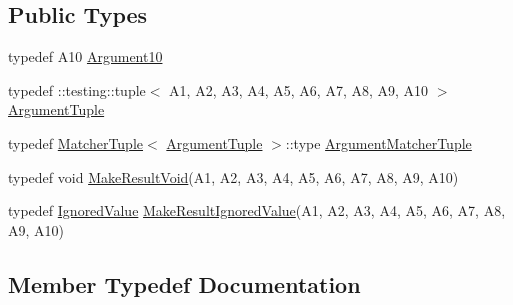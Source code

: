 \subsection*{Public Types}
\begin{DoxyCompactItemize}
\item 
typedef A10 \mbox{\hyperlink{structtesting_1_1internal_1_1_function_3_01_r_07_a1_00_01_a2_00_01_a3_00_01_a4_00_01_a5_00_01_a6f6ff91550f0557b7708e490e5002cd35_a74022db8f1642276a1a9033da16cc2f5}{Argument10}}
\item 
typedef \+::testing\+::tuple$<$ A1, A2, A3, A4, A5, A6, A7, A8, A9, A10 $>$ \mbox{\hyperlink{structtesting_1_1internal_1_1_function_3_01_r_07_a1_00_01_a2_00_01_a3_00_01_a4_00_01_a5_00_01_a6f6ff91550f0557b7708e490e5002cd35_a38b8a4911806458eacc69740d4638d87}{Argument\+Tuple}}
\item 
typedef \mbox{\hyperlink{structtesting_1_1internal_1_1_matcher_tuple}{Matcher\+Tuple}}$<$ \mbox{\hyperlink{structtesting_1_1internal_1_1_function_3_01_r_07_08_4_ad483c3128c470d8cdb55c3ac1c575c11}{Argument\+Tuple}} $>$\+::type \mbox{\hyperlink{structtesting_1_1internal_1_1_function_3_01_r_07_a1_00_01_a2_00_01_a3_00_01_a4_00_01_a5_00_01_a6f6ff91550f0557b7708e490e5002cd35_ad2418eacffea2e3cc5466c93b1fd7002}{Argument\+Matcher\+Tuple}}
\item 
typedef void \mbox{\hyperlink{structtesting_1_1internal_1_1_function_3_01_r_07_a1_00_01_a2_00_01_a3_00_01_a4_00_01_a5_00_01_a6f6ff91550f0557b7708e490e5002cd35_aa0f1fef89e59875917d08ba584b05186}{Make\+Result\+Void}}(A1, A2, A3, A4, A5, A6, A7, A8, A9, A10)
\item 
typedef \mbox{\hyperlink{classtesting_1_1internal_1_1_ignored_value}{Ignored\+Value}} \mbox{\hyperlink{structtesting_1_1internal_1_1_function_3_01_r_07_a1_00_01_a2_00_01_a3_00_01_a4_00_01_a5_00_01_a6f6ff91550f0557b7708e490e5002cd35_a4e905802374219aa3e556ccc65191098}{Make\+Result\+Ignored\+Value}}(A1, A2, A3, A4, A5, A6, A7, A8, A9, A10)
\end{DoxyCompactItemize}


\subsection{Member Typedef Documentation}
\mbox{\label{structtesting_1_1internal_1_1_function_3_01_r_07_a1_00_01_a2_00_01_a3_00_01_a4_00_01_a5_00_01_a6f6ff91550f0557b7708e490e5002cd35_a74022db8f1642276a1a9033da16cc2f5}} 
